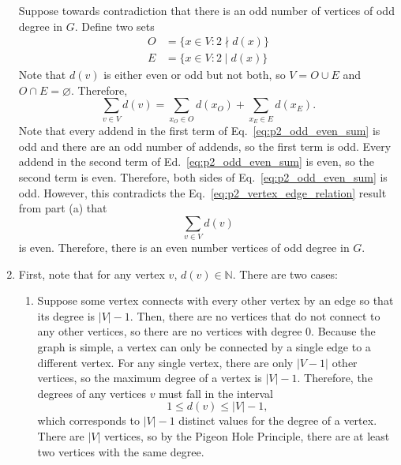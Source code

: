 \documentclass[12pt]{extarticle}
\begin{document}
\begin{sol}
\begin{enumerate}[label=(\alph*)]
		      Suppose towards contradiction that there is an odd number of vertices of odd degree in $G$.
		      Define two sets
		      \begin{align*}
			      O & = \{x \in V : 2 \nmid d(x) \} \\
			      E & = \{x \in V : 2 \mid d(x) \}
		      \end{align*}
		      Note that $d(v)$ is either even or odd but not both, so $V = O \cup E$ and $O \cap E = \varnothing$.
		      Therefore,
		      \begin{equation}
			      \sum_{v\in V} d(v) = \sum_{x_O \in O} d(x_O) + \sum_{x_E \in E} d(x_E). \label{eq:p2_odd_even_sum}
		      \end{equation}
		      Note that every addend in the first term of Eq.~\eqref{eq:p2_odd_even_sum} is odd and there are an odd number of addends, so the first term is odd.
		      Every addend in the second term of Ed.~\eqref{eq:p2_odd_even_sum} is even, so the second term is even.
		      Therefore, both sides of Eq.~\eqref{eq:p2_odd_even_sum} is odd.
		      However, this contradicts the Eq.~\eqref{eq:p2_vertex_edge_relation} result from part (a) that
		      \begin{equation*}
			      \sum_{v\in V} d(v)
		      \end{equation*}
		      is even.
		      Therefore, there is an even number vertices of odd degree in $G$.
		\item First, note that for any vertex $v$, $d(v) \in \mathbb{N}$.
		      There are two cases:
		      \begin{enumerate} [label=\arabic*.]
			      \item Suppose some vertex connects with every other vertex by an edge so that its degree is $|V| - 1$.
			            Then, there are no vertices that do not connect to any other vertices, so there are no vertices with degree $0$.
			            Because the graph is simple, a vertex can only be connected by a single edge to a different vertex.
			            For any single vertex, there are only $|V-1|$ other vertices, so the maximum degree of a vertex is $|V| - 1$.
			            Therefore, the degrees of any vertices $v$ must fall in the interval
			            \begin{equation}
				            1 \leq d(v) \leq |V| - 1, \label{eq:p2_case1_range}
			            \end{equation}
			            which corresponds to $|V| - 1$ distinct values for the degree of a vertex.
			            There are $|V|$ vertices, so by the Pigeon Hole Principle, there are at least two vertices with the same degree.


\end{enumerate}
\end{enumerate}
\end{sol}
\end{document}
